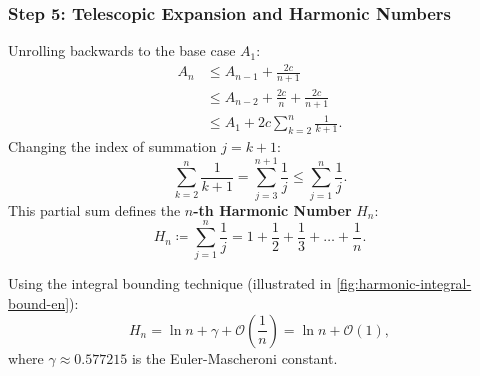 \subsubsection{Step 5: Telescopic Expansion and Harmonic Numbers}
Unrolling backwards to the base case $A_1$:
\begin{align}
  A_n &\le A_{n-1} + \frac{2c}{n+1} \\
      &\le A_{n-2} + \frac{2c}{n} + \frac{2c}{n+1} \\
      &\le A_1 + 2c \sum_{k=2}^n \frac{1}{k+1}.
\end{align}
Changing the index of summation $j = k + 1$:
\begin{equation}
  \sum_{k=2}^n \frac{1}{k+1} = \sum_{j=3}^{n+1} \frac{1}{j} \le \sum_{j=1}^n \frac{1}{j}.
\end{equation}
This partial sum defines the \textbf{$n$-th Harmonic Number} $H_n$:
\begin{equation}
  H_n \coloneqq \sum_{j=1}^n \frac{1}{j} = 1 + \frac{1}{2} + \frac{1}{3} + \dots + \frac{1}{n}.
\end{equation}

Using the integral bounding technique (illustrated in \autoref{fig:harmonic-integral-bound-en}):
\begin{equation}
  H_n = \ln n + \gamma + \mathcal{O}\left(\frac{1}{n}\right) = \ln n + \mathcal{O}(1),
\end{equation}
where $\gamma \approx 0.577215$ is the Euler-Mascheroni constant.

